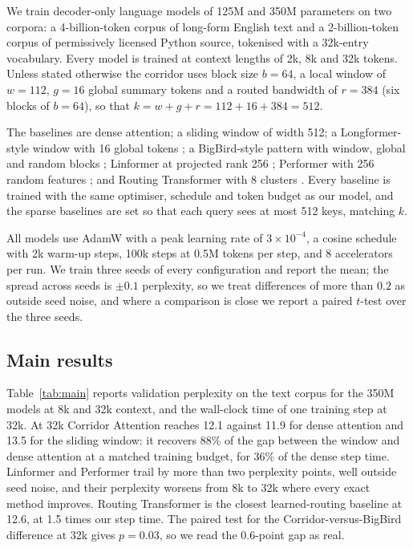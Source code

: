 \documentclass[11pt]{article}
\begin{document}
We train decoder-only language models of 125M and 350M parameters on two
corpora: a 4-billion-token corpus of long-form English text and a
2-billion-token corpus of permissively licensed Python source, tokenised
with a 32k-entry vocabulary. Every model is trained at context lengths of
2k, 8k and 32k tokens. Unless stated otherwise the corridor uses block size
$b = 64$, a local window of $w = 112$, $g = 16$ global summary tokens and a
routed bandwidth of $r = 384$ (six blocks of $b = 64$), so that
$k = w + g + r = 112 + 16 + 384 = 512$.

The baselines are dense attention; a sliding window of width 512; a
Longformer-style window with 16 global tokens \citep{beltagy2020longformer};
a BigBird-style pattern with window, global and random blocks
\citep{zaheer2020bigbird}; Linformer at projected rank 256
\citep{wang2020linformer}; Performer with 256 random features
\citep{choromanski2021performer}; and Routing Transformer with 8 clusters
\citep{roy2021efficient}. Every baseline is trained with the same optimiser,
schedule and token budget as our model, and the sparse baselines are set so
that each query sees at most 512 keys, matching $k$.

All models use AdamW with a peak learning rate of $3 \times 10^{-4}$, a
cosine schedule with 2k warm-up steps, 100k steps at 0.5M tokens per step,
and 8 accelerators per run. We train three seeds of every configuration and
report the mean; the spread across seeds is $\pm 0.1$ perplexity, so we
treat differences of more than $0.2$ as outside seed noise, and where a
comparison is close we report a paired $t$-test over the three seeds.

\subsection{Main results}\label{sec:main}

Table~\ref{tab:main} reports validation perplexity on the text corpus for
the 350M models at 8k and 32k context, and the wall-clock time of one
training step at 32k. At 32k Corridor Attention reaches 12.1 against 11.9
for dense attention and 13.5 for the sliding window: it recovers 88\% of the
gap between the window and dense attention at a matched training budget,
for 36\% of the dense step time. Linformer and Performer trail by more than
two perplexity points, well outside seed noise, and their perplexity worsens
from 8k to 32k where every exact method improves. Routing Transformer is the
closest learned-routing baseline at 12.6, at 1.5 times our step time. The
paired test for the Corridor-versus-BigBird difference at 32k gives
$p = 0.03$, so we read the 0.6-point gap as real.
\end{document}
